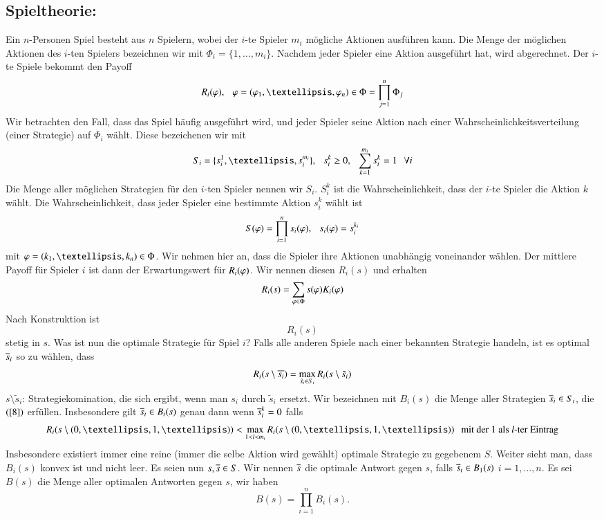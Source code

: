 \subsection*{Spieltheorie:}

Ein $n$-Personen Spiel besteht aus $n$ Spielern, wobei der $i$-te Spieler $m_i$ mögliche Aktionen
ausführen kann. Die Menge der möglichen Aktionen des $i$-ten Spielers bezeichnen wir mit
$\Phi_i=\{ 1,…,m_i \}$. Nachdem jeder Spieler eine Aktion ausgeführt hat, wird abgerechnet. Der $i$-te
Spiele bekommt den Payoff
\[
    R_i(\vp), \qq \vp=(\vp_1,…,\vp_n)\in \Phi=\prod_{j=1}^n \Phi_j
\]
Wir betrachten den Fall, dass das Spiel häufig ausgeführt wird, und jeder Spieler seine Aktion nach
einer Wahrscheinlichkeitsverteilung (einer Strategie) auf $\Phi_i $ wählt. Diese bezeichenen wir mit
\[
    S_i=\{s_i^1,…,s_i^{m_i}\},\qq s_i^k\geq 0, \qq \sum_{k=1}^{m_i}s_i^k=1 \qq \forall i
\]
Die Menge aller möglichen Strategien für den $i$-ten Spieler nennen wir $S_i$. $S_i^k$ ist die
Wahrscheinlichkeit, dass der $i$-te Spieler die Aktion $k$ wählt. Die Wahrscheinlichkeit, dass jeder
Spieler eine bestimmte Aktion $s_i^k$ wählt ist
\[
    S(\varphi)=\prod_{i=1}^n s_i(\varphi), \hspace{.25cm} s_i(\varphi)=s_i^{k_i}
\]
mit $\vp=(k_1,…,k_n)\in \Phi$. Wir nehmen hier an, dass die Spieler ihre Aktionen unabhängig voneinander
wählen. Der mittlere Payoff für Spieler $i$ ist dann der Erwartungswert für $R_i(\varphi)$. Wir nennen diesen
$R_i(s)$ und erhalten
\[
    R_i(s)=\sum_{\varphi\in\Phi}s(\varphi) K_i(\varphi)
\]
Nach Konstruktion ist
\[
    R_i(s)
\]
stetig in $s$. Was ist nun die optimale Strategie für Spiel $i$? Falls alle anderen Spiele nach einer
bekannten  Strategie handeln, ist es optimal $\overline{s}_i$ so zu wählen, dass
\begin{align}\label{8}
    R_i(s\setminus \overline{s_i})=\max_{\tilde s_i \in S_i} R_i(s\setminus \tilde s_i)
\end{align}
$s\setminus \tilde s_i$: Strategiekomination, die sich ergibt, wenn man $s_i$ durch  $\tilde s_i$
ersetzt. Wir bezeichnen mit $B_i(s)$ die Menge aller Strategien $\overline s_i\in S_i$, die $(\ref{8})$ erfüllen.
Insbesondere gilt $\overline s_i\in B_i(s)$ genau dann wenn $\overline s_i^k=0$ falls
\[
    R_i(s\setminus (0,…,1,…)) < \max_{1<l<m_i}R_i(s\setminus(0,…,1,…)) \qq \text{mit der 1 als $l$-ter
    Eintrag}
\]
Insbesondere existiert immer eine reine (immer die selbe Aktion wird gewählt) optimale Strategie
zu gegebenem $S$. Weiter sieht man, dass $B_i(s)$ konvex ist und nicht leer. Es seien nun $s,\overline s\in S$.
Wir nennen $\overline s$ die optimale Antwort gegen $s$, falls $\overline s_i\in B_1(s)$ $i=1,…,n$.
Es sei $B(s)$ die Menge aller optimalen Antworten gegen $s$, wir haben
\[
    B(s)=\prod_{i=1}^n B_i(s).
\]

